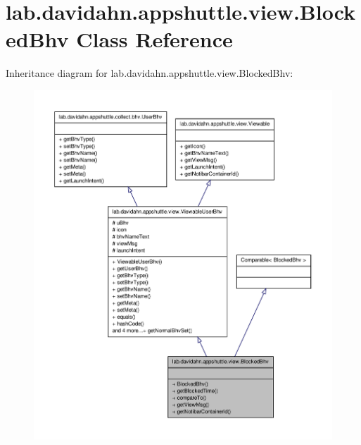 \hypertarget{classlab_1_1davidahn_1_1appshuttle_1_1view_1_1_blocked_bhv}{\section{lab.\-davidahn.\-appshuttle.\-view.\-Blocked\-Bhv \-Class \-Reference}
\label{classlab_1_1davidahn_1_1appshuttle_1_1view_1_1_blocked_bhv}
}


\-Inheritance diagram for lab.\-davidahn.\-appshuttle.\-view.\-Blocked\-Bhv\-:
\nopagebreak
\begin{figure}[H]
\begin{center}
\leavevmode
\includegraphics[width=350pt]{classlab_1_1davidahn_1_1appshuttle_1_1view_1_1_blocked_bhv__inherit__graph}
\end{center}
\end{figure}


